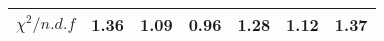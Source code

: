 \begin{table}[H]
{{\begin{tabular}{lrrrrrr}
\rule{0pt}{4ex}$\chi^2 / n.d.f$ & 1.36 & 1.09 & 0.96 & 1.28 & 1.12 & 1.37\\
\bottomrule
\end{tabular}
} %

} %
\label{tab:chib:ups1s:fits}
\end{table}
